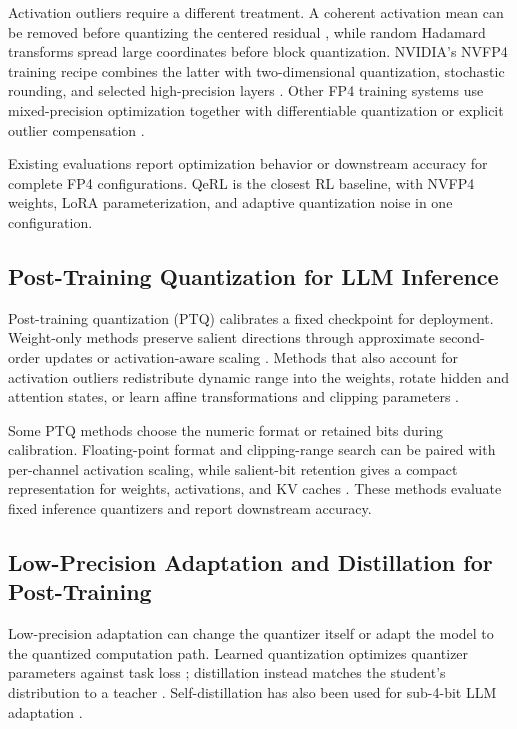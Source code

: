 \documentclass[letterpaper]{article}
\begin{document}
Activation outliers require a different treatment. A coherent activation mean can be removed before quantizing the centered residual \citep{cao2026averis}, while random Hadamard transforms spread large coordinates before block quantization. NVIDIA's NVFP4 training recipe combines the latter with two-dimensional quantization, stochastic rounding, and selected high-precision layers \citep{nvidia2025nvfp4}. Other FP4 training systems use mixed-precision optimization together with differentiable quantization or explicit outlier compensation \citep{wang2025optimizing,chmiel2025fp4}.

Existing evaluations report optimization behavior or downstream accuracy for complete FP4 configurations. QeRL is the closest RL baseline, with NVFP4 weights, LoRA parameterization, and adaptive quantization noise in one configuration.

\subsection{Post-Training Quantization for LLM Inference}

Post-training quantization (PTQ) calibrates a fixed checkpoint for deployment. Weight-only methods preserve salient directions through approximate second-order updates or activation-aware scaling \citep{frantar2023gptq,lin2024awq}. Methods that also account for activation outliers redistribute dynamic range into the weights, rotate hidden and attention states, or learn affine transformations and clipping parameters \citep{xiao2023smoothquant,ashkboos2024quarot,sun2024flatquant,shao2024omniquant}.

Some PTQ methods choose the numeric format or retained bits during calibration. Floating-point format and clipping-range search can be paired with per-channel activation scaling, while salient-bit retention gives a compact representation for weights, activations, and KV caches \citep{liu2023llmfp4,lee2025qrazor}. These methods evaluate fixed inference quantizers and report downstream accuracy.

\subsection{Low-Precision Adaptation and Distillation for Post-Training}

Low-precision adaptation can change the quantizer itself or adapt the model to the quantized computation path. Learned quantization optimizes quantizer parameters against task loss \citep{esser2020lsq}; distillation instead matches the student's distribution to a teacher \citep{hinton2015distilling}. Self-distillation has also been used for sub-4-bit LLM adaptation \citep{du2024bitdistiller}.
\end{document}
